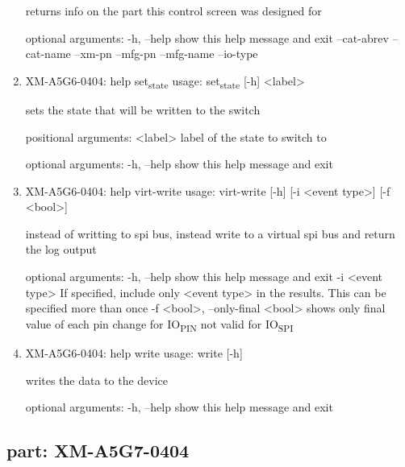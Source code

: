 \documentclass[11pt]{article}
\begin{document}
\begin{enumerate}
returns info on the part this control screen was designed for

optional arguments:
  -h, --help   show this help message and exit
  --cat-abrev
  --cat-name
  --xm-pn
  --mfg-pn
  --mfg-name
  --io-type

\item XM-A5G6-0404: help set\textsubscript{state}
\label{sec:org8a9f0b7}
usage: set\textsubscript{state} [-h] <label>

sets the state that will be written to the switch

positional arguments:
  <label>     label of the state to switch to

optional arguments:
  -h, --help  show this help message and exit

\item XM-A5G6-0404: help virt-write
\label{sec:orgc8892e6}
usage: virt-write [-h] [-i <event type>] [-f <bool>]

instead of writting to spi bus, instead write to a virtual spi bus and return
the log output

optional arguments:
  -h, --help            show this help message and exit
  -i <event type>       If specified, include only <event type> in the
                        results. This can be specified more than once
  -f <bool>, --only-final <bool>
                        shows only final value of each pin change for IO\textsubscript{PIN}
                        not valid for IO\textsubscript{SPI}

\item XM-A5G6-0404: help write
\label{sec:orgda6c6f7}
usage: write [-h]

writes the data to the device

optional arguments:
  -h, --help  show this help message and exit
\end{enumerate}

\subsection{part: XM-A5G7-0404}
\label{sec:orgd6ab7ad}
\end{document}
